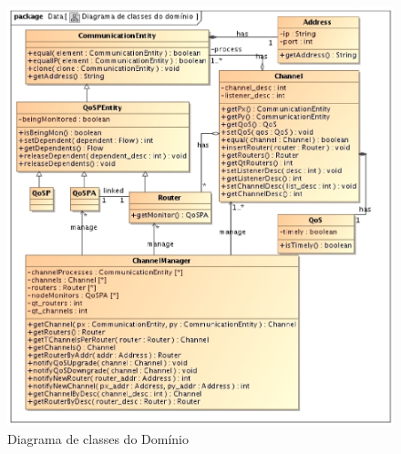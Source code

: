 \begin{figure}
\centering
\includegraphics[scale=0.7]{diagrama_dominio}
\caption{Diagrama de classes do Domínio}
\label{fig:diagrama_classe_dominio}
\end{figure}
	
